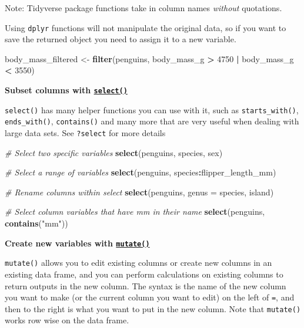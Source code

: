\documentclass[
]{book}
\newenvironment{Shaded}{\begin{snugshade}}{\end{snugshade}}
\newcommand{\AttributeTok}[1]{\textcolor[rgb]{0.13,0.29,0.53}{#1}}
\newcommand{\CommentTok}[1]{\textcolor[rgb]{0.56,0.35,0.01}{\textit{#1}}}
\newcommand{\DecValTok}[1]{\textcolor[rgb]{0.00,0.00,0.81}{#1}}
\newcommand{\FunctionTok}[1]{\textcolor[rgb]{0.13,0.29,0.53}{\textbf{#1}}}
\newcommand{\NormalTok}[1]{#1}
\newcommand{\OtherTok}[1]{\textcolor[rgb]{0.56,0.35,0.01}{#1}}
\newcommand{\SpecialCharTok}[1]{\textcolor[rgb]{0.81,0.36,0.00}{\textbf{#1}}}
\newcommand{\StringTok}[1]{\textcolor[rgb]{0.31,0.60,0.02}{#1}}
\begin{document}
Note: Tidyverse package functions take in column names \emph{without} quotations.

Using \texttt{dplyr} functions will not manipulate the original data, so if you want to save the returned object you need to assign it to a new variable.

\begin{Shaded}
\begin{Highlighting}[]
\NormalTok{body\_mass\_filtered }\OtherTok{\textless{}{-}} \FunctionTok{filter}\NormalTok{(penguins, body\_mass\_g }\SpecialCharTok{\textgreater{}} \DecValTok{4750} \SpecialCharTok{|}\NormalTok{ body\_mass\_g }\SpecialCharTok{\textless{}} \DecValTok{3550}\NormalTok{)}
\end{Highlighting}
\end{Shaded}

\textbf{Subset columns with \href{https://dplyr.tidyverse.org/reference/select.html}{\texttt{select()}}}

\texttt{select()} has many helper functions you can use with it, such as \texttt{starts\_with()}, \texttt{ends\_with()}, \texttt{contains()} and many more that are very useful when dealing with large data sets. See \texttt{?select} for more details

\begin{Shaded}
\begin{Highlighting}[]
\CommentTok{\# Select two specific variables}
\FunctionTok{select}\NormalTok{(penguins, species, sex)}

\CommentTok{\# Select a range of variables}
\FunctionTok{select}\NormalTok{(penguins, species}\SpecialCharTok{:}\NormalTok{flipper\_length\_mm)}

\CommentTok{\# Rename columns within select}
\FunctionTok{select}\NormalTok{(penguins, }\AttributeTok{genus =}\NormalTok{ species, island)}

\CommentTok{\# Select column variables that have \textquotesingle{}mm\textquotesingle{} in their name}
\FunctionTok{select}\NormalTok{(penguins, }\FunctionTok{contains}\NormalTok{(}\StringTok{"mm"}\NormalTok{))}
\end{Highlighting}
\end{Shaded}

\textbf{Create new variables with \href{https://dplyr.tidyverse.org/reference/mutate.html}{\texttt{mutate()}}}

\texttt{mutate()} allows you to edit existing columns or create new columns in an existing data frame, and you can perform calculations on existing columns to return outputs in the new column. The syntax is the name of the new column you want to make (or the current column you want to edit) on the left of \texttt{=}, and then to the right is what you want to put in the new column. Note that \texttt{mutate()} works row wise on the data frame.
\end{document}
